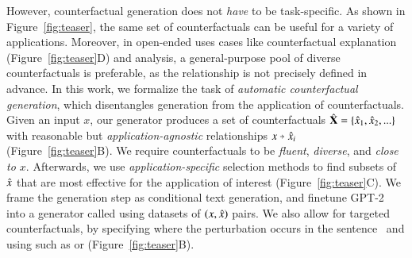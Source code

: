 % 
However, counterfactual generation does not \emph{have} to be task-specific.
As shown in Figure~\ref{fig:teaser}, the same set of counterfactuals can be useful for a variety of applications.
Moreover, in open-ended uses cases like counterfactual explanation (Figure~\ref{fig:teaser}D) and analysis, a general-purpose pool of diverse counterfactuals is preferable, as the relationship is not precisely defined in advance.
In this work, we formalize the task of \emph{automatic counterfactual generation}, which disentangles generation from the application of counterfactuals.
Given an input $x$, our generator produces a set of counterfactuals $\hat{\mathbf{X}} = \{\hat{x}_1, \hat{x}_2, ...\}$ with reasonable but \emph{application-agnostic} relationships $x \veryshortarrow \xp_i$ (Figure~\ref{fig:teaser}B).
We require counterfactuals to be \emph{fluent}, \emph{diverse}, and \emph{close to $x$}.
Afterwards, we use \emph{application-specific} selection methods to find subsets of $\hat{x}$ that are most effective for the application of interest (Figure~\ref{fig:teaser}C).
We frame the generation step as conditional text generation, and finetune GPT-2~\cite{radford2019language} into a generator called \emph{\sysname} using datasets of $(x, \hat{x})$ pairs. 
We also allow for targeted counterfactuals, by specifying where the perturbation occurs in the sentence~\cite{donahue2020enabling} and using \tagstrs such as  or  (Figure~\ref{fig:teaser}B).

